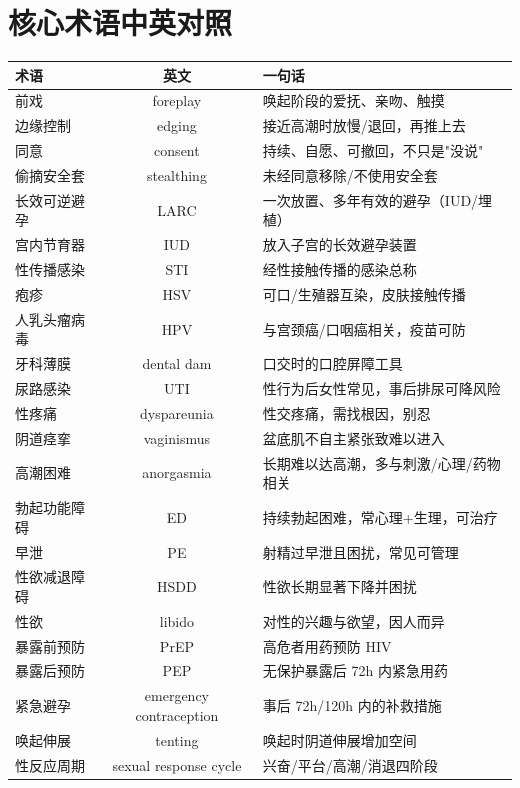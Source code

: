 \documentclass[12pt,UTF8,openany]{ctexbook}
\begin{document}
\section{核心术语中英对照}

\begin{tabularx}{\textwidth}{l C X}
\toprule
术语 & 英文 & 一句话 \\
\midrule
前戏 & foreplay & 唤起阶段的爱抚、亲吻、触摸 \\
边缘控制 & edging & 接近高潮时放慢/退回，再推上去 \\
同意 & consent & 持续、自愿、可撤回，不只是"没说" \\
偷摘安全套 & stealthing & 未经同意移除/不使用安全套 \\
长效可逆避孕 & LARC & 一次放置、多年有效的避孕（IUD/埋植） \\
宫内节育器 & IUD & 放入子宫的长效避孕装置 \\
性传播感染 & STI & 经性接触传播的感染总称 \\
疱疹 & HSV & 可口/生殖器互染，皮肤接触传播 \\
人乳头瘤病毒 & HPV & 与宫颈癌/口咽癌相关，疫苗可防 \\
牙科薄膜 & dental dam & 口交时的口腔屏障工具 \\
尿路感染 & UTI & 性行为后女性常见，事后排尿可降风险 \\
性疼痛 & dyspareunia & 性交疼痛，需找根因，别忍 \\
阴道痉挛 & vaginismus & 盆底肌不自主紧张致难以进入 \\
高潮困难 & anorgasmia & 长期难以达高潮，多与刺激/心理/药物相关 \\
勃起功能障碍 & ED & 持续勃起困难，常心理+生理，可治疗 \\
早泄 & PE & 射精过早泄且困扰，常见可管理 \\
性欲减退障碍 & HSDD & 性欲长期显著下降并困扰 \\
性欲 & libido & 对性的兴趣与欲望，因人而异 \\
暴露前预防 & PrEP & 高危者用药预防 HIV \\
暴露后预防 & PEP & 无保护暴露后 72h 内紧急用药 \\
紧急避孕 & emergency contraception & 事后 72h/120h 内的补救措施 \\
唤起伸展 & tenting & 唤起时阴道伸展增加空间 \\
性反应周期 & sexual response cycle & 兴奋/平台/高潮/消退四阶段 \\
\bottomrule
\end{tabularx}
\end{document}
